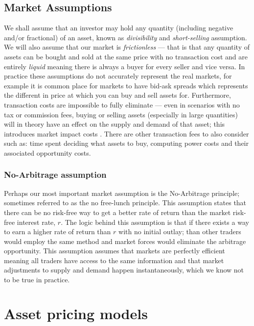 \subsection{Market Assumptions}

We shall assume that an investor may hold any quantity (including negative and/or fractional) of an asset, known as \textit{divisibility} and \textit{short-selling} assumption. We will also assume that our market is \textit{frictionless} --- that is that any quantity of assets can be bought and sold at the same price with no transaction cost and are entirely \textit{liquid} meaning there is always a buyer for every seller and vice versa.
\nline{}
In practice these assumptions do not accurately represent the real markets, for example it is common place for markets to have bid-ask spreads which represents the different in price at which you can buy and sell assets for. Furthermore, transaction costs are impossible to fully eliminate --- even in scenarios with no tax or commission fees, buying or selling assets (especially in large quantities) will in theory have an effect on the supply and demand of that asset; this introduces market impact costs \cite{moro2009market}. There are other transaction fees to also consider such as: time spent deciding what assets to buy, computing power costs and their associated opportunity costs.

\subsubsection{No-Arbitrage assumption}

Perhaps our most important market assumption is the No-Arbitrage principle; sometimes referred to as the no free-lunch principle. This assumption states that there can be no risk-free way to get a better rate of return than the market risk-free interest rate, \(r\). The logic behind this assumption is that if there exists a way to earn a higher rate of return than \(r\) with no initial outlay; than other traders would employ the same method and market forces would eliminate the arbitrage opportunity. This assumption assumes that markets are perfectly efficient meaning all traders have access to the same information and that market adjustments to supply and demand happen instantaneously, which we know not to be true in practice.

\section{Asset pricing models}

